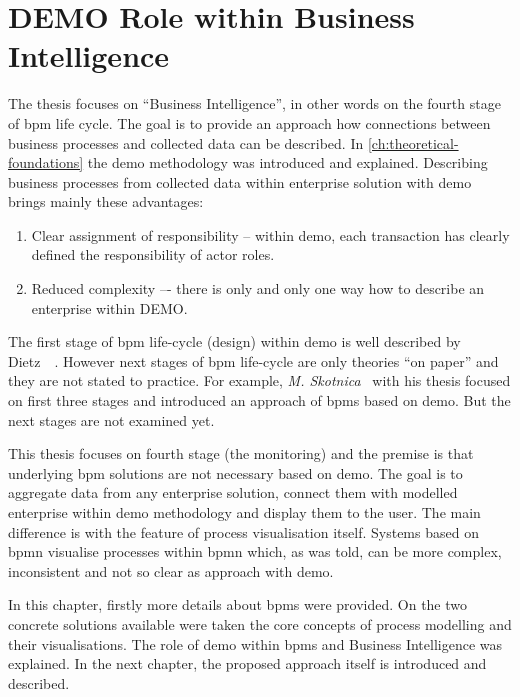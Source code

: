 \section{DEMO Role within Business Intelligence}
The thesis focuses on ``Business Intelligence'', in other words on the fourth stage of \gls{bpm} life cycle. The goal is to provide an approach how connections between business processes and collected data can be described. In \cref{ch:theoretical-foundations} the \gls{demo} methodology was introduced and explained. Describing business processes from collected data within enterprise solution with \gls{demo} brings mainly these advantages: 
\begin{enumerate}
\item Clear assignment of responsibility -- within \gls{demo}, each transaction has clearly defined the responsibility of actor roles. 
\item Reduced complexity –- there is only and only one way how to describe an enterprise within DEMO.
\end{enumerate}

The first stage of \gls{bpm} life-cycle (design) within \gls{demo} is well described by Dietz~\cite{dietz-essence-2015}~\cite{dietz-enterprise-2006}. However next stages of \gls{bpm} life-cycle are only theories ``on paper'' and they are not stated to practice. For example, \textit{M. Skotnica}~\cite{diploma-skotnica-2016} with his thesis focused on first three stages and introduced an approach of \gls{bpms} based on \gls{demo}. But the next stages are not examined yet.

This thesis focuses on fourth stage (the monitoring) and the premise is that underlying \gls{bpm} solutions are not necessary based on \gls{demo}. The goal is to aggregate data from any enterprise solution, connect them with modelled enterprise within \gls{demo} methodology and display them to the user. The main difference is with the feature of process visualisation itself. Systems based on \gls{bpmn} visualise processes within \gls{bpmn} which, as was told, can be more complex, inconsistent and not so clear as approach with \gls{demo}. 

In this chapter, firstly more details about \gls{bpms} were provided. On the two concrete solutions available were taken the core concepts of process modelling and their visualisations. The role of \gls{demo} within \gls{bpms} and Business Intelligence was explained. In the next chapter, the proposed approach itself is introduced and described.